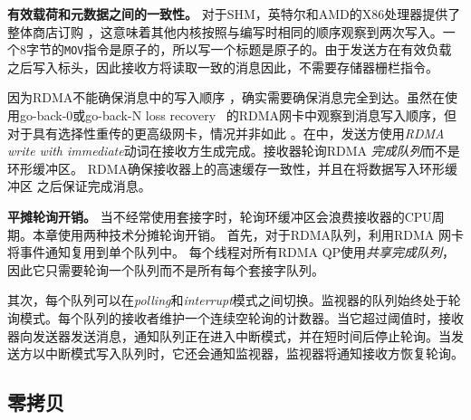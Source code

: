 \textbf {有效载荷和元数据之间的一致性。}
对于SHM，英特尔和AMD的X86处理器提供了整体商店订购 \cite {sewell2010x86,intel-manual}，这意味着其他内核按照与编写时相同的顺序观察到两次写入。一个8字节的\texttt {MOV}指令是原子的，所以写一个标题是原子的。由于发送方在有效负载之后写入标头，因此接收方将读取一致的消息因此，不需要存储器栅栏指令。

因为RDMA不能确保消息中的写入顺序 \cite {infiniband2000infiniband}，确实需要确保消息完全到达。虽然在使用go-back-0或go-back-N loss recovery~ \cite {dragojevic2014farm}的RDMA网卡中观察到消息写入顺序，但对于具有选择性重传的更高级网卡，情况并非如此 \cite {mprdma,mittal2018revisiting} 。在\libipc {}中，发送方使用\textit {RDMA write with immediate}动词在接收方生成完成。接收器轮询RDMA \emph {完成队列}而不是环形缓冲区。 RDMA确保接收器上的高速缓存一致性，并且在将数据写入\libipc {}环形缓冲区 \cite {infiniband2000infiniband}之后保证完成消息。


\textbf {平摊轮询开销。}
当不经常使用套接字时，轮询环缓冲区会浪费接收器的CPU周期。本章使用两种技术分摊轮询开销。
首先，对于RDMA队列，利用RDMA 网卡将事件通知复用到单个队列中。
每个线程对所有RDMA QP使用\emph {共享完成队列}，因此它只需要轮询一个队列而不是所有每个套接字队列。

其次，每个队列可以在\textit {polling}和\textit {interrupt}模式之间切换。监视器的队列始终处于轮询模式。每个队列的接收者维护一个连续空轮询的计数器。当它超过阈值时，接收器向发送器发送消息，通知队列正在进入中断模式，并在短时间后停止轮询。当发送方以中断模式写入队列时，它还会通知监视器，监视器将通知接收方恢复轮询。



\subsection{零拷贝}
\label{socksdirect:subsec:zerocopy}


